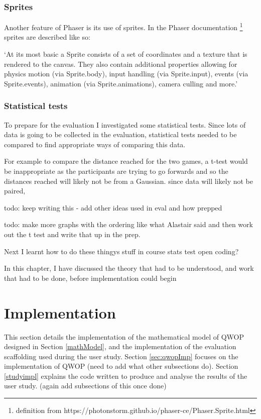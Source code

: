 \documentclass[12pt,a4paper,twoside,openright]{report}
\begin{document}
\subsection{Sprites}

Another feature of Phaser is its use of sprites.
In the Phaser documentation \footnote{definition from https://photonstorm.github.io/phaser-ce/Phaser.Sprite.html}
sprites are described like so:

\begin{displayquote}
`At its most basic a Sprite consists of a set of coordinates and a texture that is rendered to the canvas. They also contain additional properties allowing for physics motion (via Sprite.body), input handling (via Sprite.input), events (via Sprite.events), animation (via Sprite.animations), camera culling and more.'
\end{displayquote}

\subsection{Statistical tests}

To prepare for the evaluation I investigated some statistical tests. 
Since lots of data is going to be collected in the evaluation, 
statistical tests needed to be compared to find appropriate ways of comparing this data.

For example to compare the distance reached for the two games, a t-test would be inappropriate 
as the participants are trying to go forwards and so the distances reached will likely not be from a Gaussian.
since data will likely not be paired,

todo: keep writing this - add other ideas used in eval and how prepped

todo: make more graphs with the ordering like what Alastair said and then work out the t test and write that up in the prep.


Next I learnt how to do these thingys
stuff in course
	stats test
	open coding?

In this chapter, I have discussed the theory that had to be understood, and work that
had to be done, before implementation could begin




\chapter{Implementation}
This section details the implementation of the mathematical model of QWOP 
designed in Section \ref{mathModel}, and the implementation of the evaluation scaffolding used during the user study.
Section \ref{sec:qwopImp} focuses on the implementation of QWOP
(need to add what other subsections do).
Section \ref{studyimpl} explains the code written to produce and analyse the results of the user study.
(again add subsections of this once done) 
\end{document}
